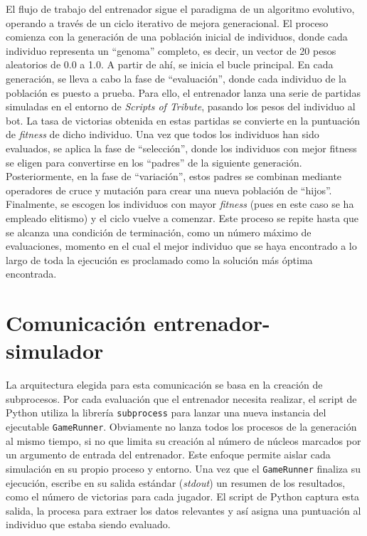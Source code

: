 El flujo de trabajo del entrenador sigue el paradigma de un algoritmo evolutivo, operando a través de un ciclo iterativo de mejora generacional. El proceso comienza con la generación de una población inicial de individuos, donde cada individuo representa un ``genoma'' completo, es decir, un vector de 20 pesos aleatorios de 0.0 a 1.0. A partir de ahí, se inicia el bucle principal. En cada generación, se lleva a cabo la fase de ``evaluación'', donde cada individuo de la población es puesto a prueba. Para ello, el entrenador lanza una serie de partidas simuladas en el entorno de \textit{Scripts of Tribute}, pasando los pesos del individuo al bot. La tasa de victorias obtenida en estas partidas se convierte en la puntuación de \textit{fitness} de dicho individuo. Una vez que todos los individuos han sido evaluados, se aplica la fase de ``selección'', donde los individuos con mejor fitness se eligen para convertirse en los ``padres'' de la siguiente generación. Posteriormente, en la fase de ``variación'', estos padres se combinan mediante operadores de cruce y mutación para crear una nueva población de ``hijos''. Finalmente, se escogen los individuos con mayor \textit{fitness} (pues en este caso se ha empleado elitismo) y el ciclo vuelve a comenzar. Este proceso se repite hasta que se alcanza una condición de terminación, como un número máximo de evaluaciones, momento en el cual el mejor individuo que se haya encontrado a lo largo de toda la ejecución es proclamado como la solución más óptima encontrada.


\section{Comunicación entrenador-simulador} \label{sec:comunicacion_entrenador_simulador}

La arquitectura elegida para esta comunicación se basa en la creación de subprocesos. Por cada evaluación que el entrenador necesita realizar, el script de Python utiliza la librería \texttt{subprocess} para lanzar una nueva instancia del ejecutable \texttt{GameRunner}. Obviamente no lanza todos los procesos de la generación al mismo tiempo, si no que limita su creación al número de núcleos marcados por un argumento de entrada del entrenador. Este enfoque permite aislar cada simulación en su propio proceso y entorno. Una vez que el \texttt{GameRunner} finaliza su ejecución, escribe en su salida estándar (\textit{stdout}) un resumen de los resultados, como el número de victorias para cada jugador. El script de Python captura esta salida, la procesa para extraer los datos relevantes y así asigna una puntuación al individuo que estaba siendo evaluado.

